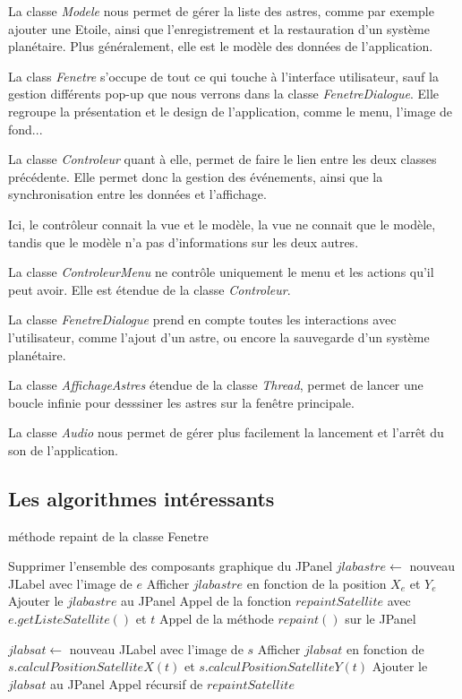 \documentclass[a4paper,10pt]{article}
\begin{document}
La classe \textit{Modele} nous permet de gérer la liste des astres, comme par exemple ajouter une Etoile, ainsi que l'enregistrement et la restauration d'un système planétaire. Plus généralement, elle est le modèle des données de l'application.

La class \textit{Fenetre} s'occupe de tout ce qui touche à l'interface utilisateur, sauf la gestion différents pop-up que nous verrons dans la classe \textit{FenetreDialogue}. Elle regroupe la présentation et le design de l'application, comme le menu, l'image de fond...

La classe \textit{Controleur} quant à elle, permet de faire le lien entre les deux classes précédente. Elle permet donc la gestion des événements, ainsi que la synchronisation entre les données et l'affichage.

Ici, le contrôleur connait la vue et le modèle, la vue ne connait que le modèle, tandis que le modèle n'a pas d'informations sur les deux autres.

La classe \textit{ControleurMenu} ne contrôle uniquement le menu et les actions qu'il peut avoir. Elle est étendue de la classe \textit{Controleur}.

La classe \textit{FenetreDialogue} prend en compte toutes les interactions avec l'utilisateur, comme l'ajout d'un astre, ou encore la sauvegarde d'un système planétaire.

La classe \textit{AffichageAstres} étendue de la classe \textit{Thread}, permet de lancer une boucle infinie pour desssiner les astres sur la fenêtre principale.

La classe \textit{Audio} nous permet de gérer plus facilement la lancement et l'arrêt du son de l'application.

\subsection{Les algorithmes intéressants}

\begin{algorithm}
\caption{méthode repaint de la classe Fenetre}
\begin{algorithmic}
\State Supprimer l'ensemble des composants graphique du JPanel
    \State $jlabastre\gets$ nouveau JLabel avec l'image de $e$
    \State Afficher $jlabastre$ en fonction de la position $X_{e}$ et $Y_{e}$
    \State Ajouter le $jlabastre$ au JPanel
    \State Appel de la fonction $repaintSatellite$ avec $e.getListeSatellite()$ et $t$
\EndFor
\State Appel de la méthode $repaint()$ sur le JPanel
\EndFunction
\end{algorithmic}

\begin{algorithmic}
  \State $jlabsat\gets$ nouveau JLabel avec l'image de $s$
  \State Afficher $jlabsat$ en fonction de $s.calculPositionSatelliteX(t)$ et $s.calculPositionSatelliteY(t)$
  \State Ajouter le $jlabsat$ au JPanel
  \State Appel récursif de $repaintSatellite$
\EndFor
\EndFunction
\end{algorithmic}
\end{algorithm}
\end{document}
